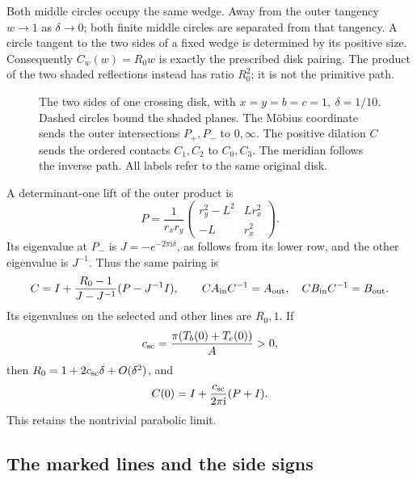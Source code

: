 \documentclass[11pt]{article}
\numberwithin{equation}{section}
\theoremstyle{definition}
\theoremstyle{remark}
\newcommand{\ii}{\mathrm i}
\begin{document}
Both middle circles occupy the same wedge. Away from the outer
tangency \(w\to1\) as \(\delta\to0\); both finite middle circles
are separated from that tangency. A circle tangent to the two sides
of a fixed wedge is determined by its positive size. Consequently
\(C_w(w)=R_0w\) is exactly the prescribed disk pairing.
The product of the two shaded reflections instead has ratio
\(R_0^2\); it is not the primitive path.

\begin{figure}[tb]
\centering

\caption{The two sides of one crossing disk, with
\(x=y=b=c=1,\ \delta=1/10\). Dashed circles bound the shaded planes.
The Möbius coordinate sends the outer intersections \(P_+,P_-\)
to \(0,\infty\). The positive dilation \(C\) sends the ordered
contacts \(C_1,C_2\) to \(C_0,C_3\). The meridian follows the inverse
path. All labels refer to the same original disk.}
\label{mf:collar-figure}
\end{figure}

A determinant-one lift of the outer product is
\begin{equation}\label{mf:P}
 P=\frac1{r_xr_y}
 \begin{pmatrix}r_y^2-L^2&Lr_x^2\\-L&r_x^2\end{pmatrix}.
\end{equation}
Its eigenvalue at \(P_-\) is \(J=-e^{-2\pi\ii\delta}\), as follows
from its lower row, and the other eigenvalue is \(J^{-1}\).
Thus the same pairing is
\begin{equation}\label{mf:C}
 C=I+\frac{R_0-1}{J-J^{-1}}(P-J^{-1}I),\qquad
 CA_{\rm in}C^{-1}=A_{\rm out},\quad
 CB_{\rm in}C^{-1}=B_{\rm out}.
\end{equation}
Its eigenvalues on the selected and other lines are \(R_0,1\).
If
\[
 c_{\rm sc}=\frac{\pi(T_b(0)+T_c(0))}{A}>0,
\]
then \(R_0=1+2c_{\rm sc}\delta+O(\delta^2)\), and
\begin{equation}\label{mf:C-complete}
                  C(0)=I+\frac{c_{\rm sc}}{2\pi\ii}(P+I).
\end{equation}
This retains the nontrivial parabolic limit.

\subsection{The marked lines and the side signs}
\end{document}
